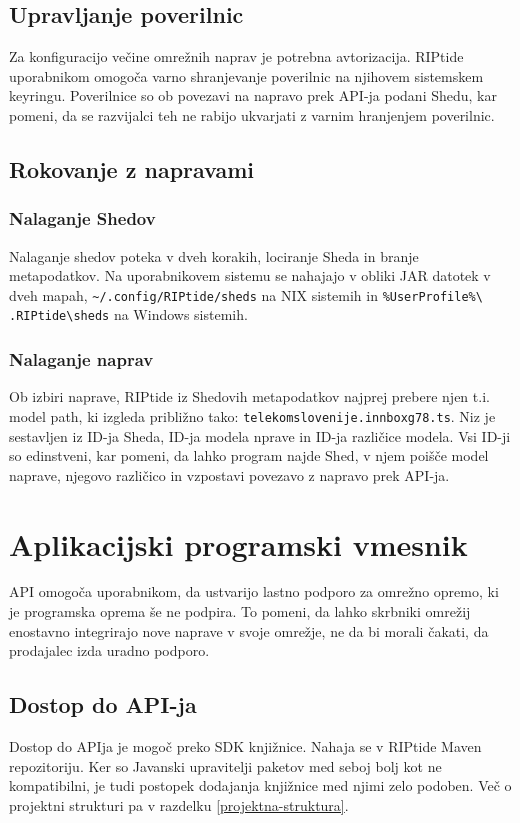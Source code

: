\documentclass[12pt]{article}
\begin{document}
\subsection{Upravljanje poverilnic}
Za konfiguracijo večine omrežnih naprav je potrebna avtorizacija.
RIPtide uporabnikom omogoča varno shranjevanje poverilnic na njihovem
sistemskem keyringu. Poverilnice so ob povezavi na napravo prek API-ja
podani Shedu, kar pomeni, da se razvijalci teh ne rabijo ukvarjati z
varnim hranjenjem poverilnic.

\subsection{Rokovanje z napravami}
\subsubsection{Nalaganje Shedov} \label{nalaganje-shedov}
Nalaganje shedov poteka v dveh korakih, lociranje Sheda in branje
metapodatkov. Na uporabnikovem sistemu se nahajajo v obliki JAR datotek v
dveh mapah, \texttt{\textasciitilde/.config/RIPtide/sheds} na NIX sistemih
in \texttt{\%UserProfile\%\textbackslash\\.RIPtide\textbackslash sheds} na
Windows sistemih.

\subsubsection{Nalaganje naprav} \label{nalaganje-naprav}
Ob izbiri naprave, RIPtide iz Shedovih metapodatkov najprej prebere
njen t.i. model path, ki izgleda približno
tako: \texttt{telekomslovenije.innboxg78.ts}. Niz je sestavljen iz ID-ja
Sheda, ID-ja modela nprave in ID-ja različice modela. Vsi ID-ji so
edinstveni, kar pomeni, da lahko program najde Shed, v njem poišče model
naprave, njegovo različico in vzpostavi povezavo z napravo prek API-ja.
\newpage

\section{Aplikacijski programski vmesnik}
API omogoča uporabnikom, da ustvarijo lastno podporo za omrežno
opremo, ki je programska oprema še ne podpira. To pomeni, da lahko
skrbniki omrežij enostavno integrirajo nove naprave v svoje omrežje, ne da
bi morali čakati, da prodajalec izda uradno podporo.

\subsection{Dostop do API-ja}
Dostop do APIja je mogoč preko SDK knjižnice. Nahaja se v RIPtide
Maven repozitoriju. Ker so Javanski upravitelji paketov med seboj bolj
kot ne kompatibilni, je tudi postopek dodajanja knjižnice med njimi
zelo podoben. Več o projektni strukturi pa v razdelku
\ref{projektna-struktura}.
\end{document}
